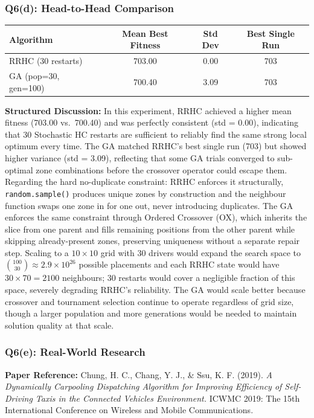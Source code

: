 \documentclass[12pt,a4paper]{article}
\begin{document}
\subsubsection*{Q6(d): Head-to-Head Comparison}

\begin{center}
\begin{tabular}{lccc}
\toprule
Algorithm & Mean Best Fitness & Std Dev & Best Single Run \\
\midrule
RRHC (30 restarts)   & 703.00 & 0.00 & 703 \\
GA (pop=30, gen=100) & 700.40 & 3.09 & 703 \\
\bottomrule
\end{tabular}
\end{center}

\textbf{Structured Discussion:}
In this experiment, RRHC achieved a higher mean fitness (703.00 vs.\ 700.40)
and was perfectly consistent (std = 0.00), indicating that 30 Stochastic HC
restarts are sufficient to reliably find the same strong local optimum every time.
The GA matched RRHC's best single run (703) but showed higher variance
(std = 3.09), reflecting that some GA trials converged to sub-optimal zone
combinations before the crossover operator could escape them.
Regarding the hard no-duplicate constraint: RRHC enforces it structurally,
\texttt{random.sample()} produces unique zones by construction and the
neighbour function swaps one zone in for one out, never introducing duplicates.
The GA enforces the same constraint through Ordered Crossover (OX), which
inherits the slice from one parent and fills remaining positions from the other
parent while skipping already-present zones, preserving uniqueness without
a separate repair step.
Scaling to a $10 \times 10$ grid with 30 drivers would expand the search space
to $\binom{100}{30} \approx 2.9 \times 10^{26}$ possible placements and each
RRHC state would have $30 \times 70 = 2100$ neighbours; 30 restarts would cover
a negligible fraction of this space, severely degrading RRHC's reliability.
The GA would scale better because crossover and tournament selection continue to
operate regardless of grid size, though a larger population and more generations
would be needed to maintain solution quality at that scale.

\subsubsection*{Q6(e): Real-World Research}

\textbf{Paper Reference:} 
Chung, H. C., Chang, Y. J., \& Ssu, K. F. (2019). 
\textit{A Dynamically Carpooling Dispatching Algorithm for Improving Efficiency of Self-Driving Taxis in the Connected Vehicles Environment.} 
ICWMC 2019: The 15th International Conference on Wireless and Mobile Communications.
\end{document}
